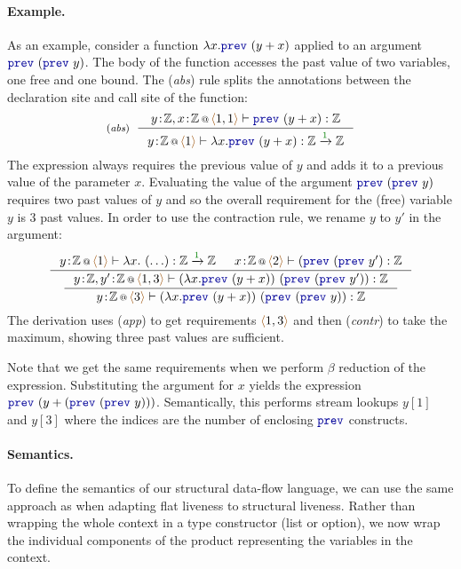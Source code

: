\paragraph{Example.} As an example, consider a function $\lambda x.\kvd{prev}~(y+x)$ applied to an argument
$\kvd{prev}~(\kvd{prev}~y)$. The body of the function accesses the past value of two variables, one free
and one bound. The (\emph{abs}) rule splits the annotations between the declaration site and call site
of the function:
%
\begin{equation*}
\tyrule{abs}
  {\coctx{y\!:\!\mathbb{Z}, x\!:\!\mathbb{Z}}{\alift{1, 1}} \vdash \kvd{prev}~(y+x) : \mathbb{Z} }
  {\coctx{y\!:\!\mathbb{Z}}{\alift{1}} \vdash \lambda x . \kvd{prev}~(y+x) : \mathbb{Z} \xrightarrow{\cclrd{1}} \mathbb{Z} }
\end{equation*}
%
The expression always requires the previous value of $y$ and adds it to a previous value of the
parameter $x$. Evaluating the value of the argument $\kvd{prev}~(\kvd{prev}~y)$ requires two past
values of $y$ and so the overall requirement for the (free) variable $y$ is $3$ past values. In
order to use the contraction rule, we rename $y$ to $y'$ in the argument:
%
\begin{equation*}
\inference
  { \coctx{y\!:\!\mathbb{Z}}{\alift{1} } \vdash \lambda x.~(\ldots) : \mathbb{Z} \xrightarrow{\cclrd{1}} \mathbb{Z} &
    \coctx{x\!:\!\mathbb{Z}}{\alift{2}} \vdash (\kvd{prev}~(\kvd{prev}~y') : \mathbb{Z} }
{\inference
  { \coctx{y\!:\!\mathbb{Z}, y'\!:\!\mathbb{Z}}{\alift{1,3}} \vdash (\lambda x.\kvd{prev}~(y+x))~(\kvd{prev}~(\kvd{prev}~y')) : \mathbb{Z} }
  { \coctx{y\!:\!\mathbb{Z}}{\alift{3}} \vdash (\lambda x.\kvd{prev}~(y+x))~(\kvd{prev}~(\kvd{prev}~y)) : \mathbb{Z} } }
\end{equation*}
%
The derivation uses (\emph{app}) to get requirements $\alift{1,3}$ and then (\emph{contr}) to take
the maximum, showing three past values are sufficient.

Note that we get the same requirements when we perform $\beta$ reduction of the expression.
Substituting the argument for $x$ yields the expression $\kvd{prev}~(y+(\kvd{prev}~(\kvd{prev}~y)))$.
Semantically, this performs stream lookups $y[1]$ and $y[3]$ where the indices are the
number of enclosing $\kvd{prev}$ constructs.

\paragraph{Semantics.}
To define the semantics of our structural data-flow language, we can use the same approach as when
adapting flat liveness to structural liveness. Rather than wrapping the whole context in a type
constructor (list or option), we now wrap the individual components of the product representing
the variables in the context.

